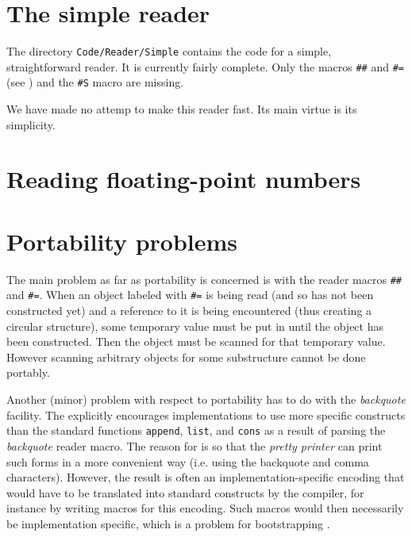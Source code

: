 \section{The simple reader}

The directory \texttt{Code/Reader/Simple} contains the code for a
simple, straightforward reader.  It is currently fairly complete.
Only the macros \texttt{\#\#} and \texttt{\#=} (see
) and the \texttt{\#S} macro
are missing.  

We have made no attemp to make this reader fast.  Its main virtue is
its simplicity.  

\section{Reading floating-point numbers}

\section{Portability problems}
\label{sec-reader-portability-problems}

The main problem as far as portability is concerned is with the reader
macros \texttt{\#\#} and \texttt{\#=}.  When an object labeled with
\texttt{\#=} is being read (and so has not been constructed yet) and a
reference to it is being encountered (thus creating a circular
structure), some temporary value must be put in until the object has
been constructed.  Then the object must be scanned for that temporary
value.  However scanning arbitrary objects for some substructure
cannot be done portably.

Another (minor) problem with respect to portability has to do with the
\emph{backquote} facility.  The \hs{} explicitly encourages
implementations to use more specific constructs than the standard
\cl{} functions \texttt{append}, \texttt{list}, and \texttt{cons} as a
result of parsing the \emph{backquote} reader macro.  The reason for
is so that the \emph{pretty printer} can print such forms in a more
convenient way (i.e. using the backquote and comma characters).
However, the result is often an implementation-specific encoding that
would have to be translated into standard \cl{} constructs by the
compiler, for instance by writing macros for this encoding.  Such
macros would then necessarily be implementation specific, which is a
problem for bootstrapping \sysname{}.  

